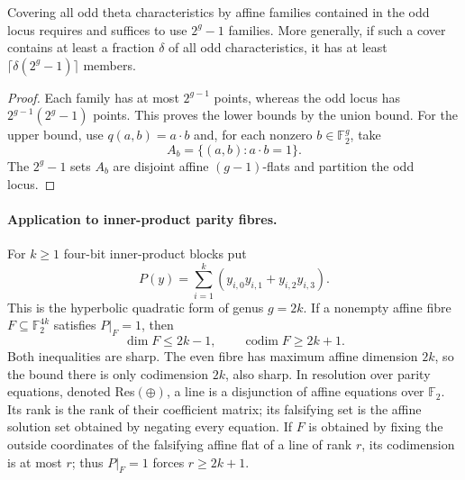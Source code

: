 \begin{corollary}
\label{cor:odd-theta-cover}
Covering all odd theta characteristics by affine families contained
in the odd locus requires and suffices to use \(2^g-1\) families.
More generally, if such a cover contains at least a fraction \(\delta\)
of all odd characteristics, it has at least
\(\lceil\delta(2^g-1)\rceil\) members.
\end{corollary}
\begin{proof}
Each family has at most \(2^{g-1}\) points, whereas the odd locus has
\(2^{g-1}(2^g-1)\) points. This proves the lower bounds by the union
bound. For the upper bound, use \(q(a,b)=a\cdot b\) and, for each
nonzero \(b\in\mathbb F_2^g\), take
\[
 A_b=\{(a,b):a\cdot b=1\}.
\]
The \(2^g-1\) sets \(A_b\) are disjoint affine \((g-1)\)-flats and
partition the odd locus.
\end{proof}

\paragraph{Application to inner-product parity fibres.}
For \(k\geq1\) four-bit inner-product blocks put
\[
 P(y)=\sum_{i=1}^k(y_{i,0}y_{i,1}+y_{i,2}y_{i,3}).
\]
This is the hyperbolic quadratic form of genus \(g=2k\). If a
nonempty affine fibre \(F\subseteq\mathbb F_2^{4k}\) satisfies
\(P|_F=1\), then
\begin{equation}
 \dim F\leq2k-1,\qquad \operatorname{codim}F\geq2k+1.
 \label{eq:odd-ip-rank}
\end{equation}
Both inequalities are sharp. The even fibre has maximum affine
dimension \(2k\), so the bound there is only codimension \(2k\), also
sharp. In resolution over parity equations, denoted Res\((\oplus)\),
a line is a disjunction of affine equations over \(\mathbb F_2\).
Its rank is the rank of their coefficient matrix; its falsifying set
is the affine solution set obtained by negating every equation.
If \(F\) is obtained by fixing the outside coordinates of the
falsifying affine flat of a line of rank \(r\), its codimension is at
most \(r\); thus \(P|_F=1\) forces \(r\geq2k+1\).

